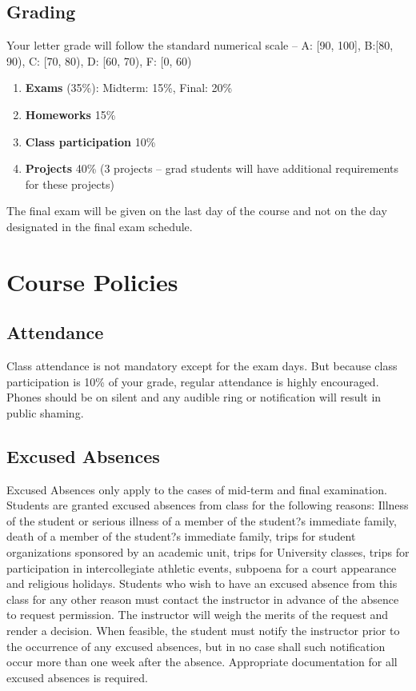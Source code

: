 \documentclass[11pt]{article}
\begin{document}
\subsection*{Grading}
Your letter grade will follow the standard numerical scale -- A: [90, 100], B:[80, 90), C: [70, 80), D: [60, 70), F: [0, 60) \\
\begin{enumerate}
\item \textbf{Exams} (35\%): Midterm: 15\%, Final: 20\% 
\item \textbf{Homeworks} 15\%
\item \textbf{Class participation} 10\%
\item \textbf{Projects} 40\% (3 projects -- grad students will have additional requirements for these projects)
\end{enumerate}

The final exam will be given on the last day of the course and not on the day designated in the final exam schedule.




\newpage
\section*{Course Policies}

\subsection{Attendance}
Class attendance is not mandatory except for the exam days. But because class participation is 10\% of your grade, regular attendance is highly encouraged. Phones should be on silent and any audible ring or notification will result in public shaming.
\subsection{Excused Absences}
Excused Absences only apply to the cases of mid-term and final examination. Students are granted excused absences from class for the following reasons: Illness of the student or serious illness of a member of the student?s immediate family, death of a member of the student?s immediate family, trips for student organizations sponsored by an academic unit, trips for University classes, trips for participation in intercollegiate athletic events, subpoena for a court appearance and religious holidays. Students who wish to have an excused absence from this class for any other reason must contact the instructor in advance of the absence to request permission. The instructor will weigh the merits of the request and render a decision. When feasible, the student must notify the instructor prior to the occurrence of any excused absences, but in no case shall such notification occur more than one week after the absence. Appropriate documentation for all excused absences is required. 
\end{document}
